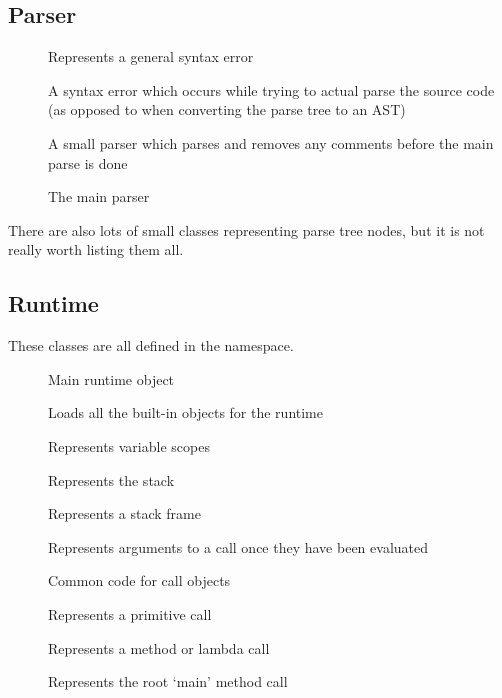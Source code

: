 \subsection{Parser}

\begin{description}
  \item[] Represents a general syntax error
  
  \item[] A syntax error which occurs while trying to actual parse the source code (as opposed to when converting the parse tree to an AST)
  
  \item[] A small parser which parses and removes any comments before the main parse is done
  
  \item[] The main parser
\end{description}

There are also lots of small classes representing parse tree nodes, but it is not really worth listing them all.

\subsection{Runtime}

These classes are all defined in the  namespace.

\begin{description}
  \item[] Main runtime object
  
  \item[] Loads all the built-in objects for the runtime
  
  \item[] Represents variable scopes
  
  \item[] Represents the stack
  
  \item[] Represents a stack frame
  
  \item[] Represents arguments to a call once they have been evaluated
  
  \item[] Common code for call objects
  
  \item[] Represents a primitive call
  
  \item[] Represents a method or lambda call
  
  \item[] Represents the root `main' method call
\end{description}

